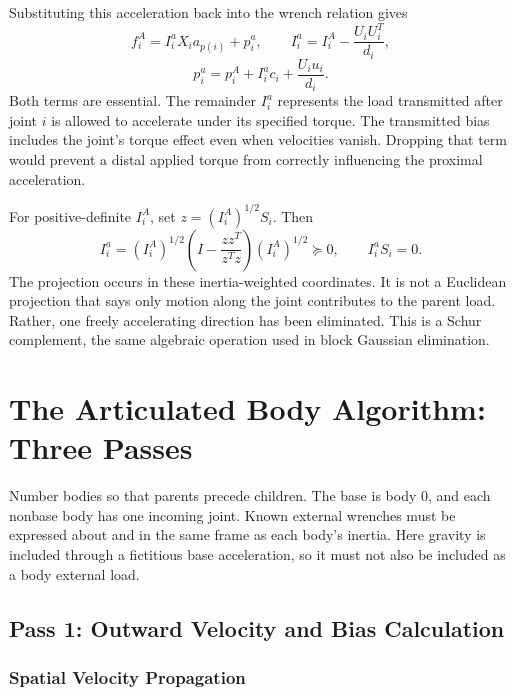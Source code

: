 Substituting this acceleration back into the wrench relation gives
\begin{equation}
 f_i^A=I_i^a X_i a_{p(i)}+p_i^a,
 \qquad I_i^a=I_i^A-\frac{U_iU_i^T}{d_i},
\end{equation}
\begin{equation}
 p_i^a=p_i^A+I_i^a c_i+\frac{U_i u_i}{d_i}.
\end{equation}
Both terms are essential. The remainder $I_i^a$ represents the load transmitted after joint $i$ is allowed to accelerate under its specified torque. The transmitted bias includes the joint's torque effect even when velocities vanish. Dropping that term would prevent a distal applied torque from correctly influencing the proximal acceleration.

For positive-definite $I_i^A$, set $z=(I_i^A)^{1/2}S_i$. Then
\begin{equation}
 I_i^a=(I_i^A)^{1/2}
 \left(I-\frac{zz^T}{z^Tz}\right)(I_i^A)^{1/2}\succeq0,
 \qquad I_i^aS_i=0.
\end{equation}
The projection occurs in these inertia-weighted coordinates. It is not a Euclidean projection that says only motion along the joint contributes to the parent load. Rather, one freely accelerating direction has been eliminated. This is a Schur complement, the same algebraic operation used in block Gaussian elimination.

\section{The Articulated Body Algorithm: Three Passes}
\label{sec:aba_three_passes}

Number bodies so that parents precede children. The base is body $0$, and each nonbase body has one incoming joint. Known external wrenches must be expressed about and in the same frame as each body's inertia. Here gravity is included through a fictitious base acceleration, so it must not also be included as a body external load.

\subsection{Pass 1: Outward Velocity and Bias Calculation}
\label{subsec:pass1_outward}

\subsubsection{Spatial Velocity Propagation}
\label{subsubsec:velocity_propagation}

